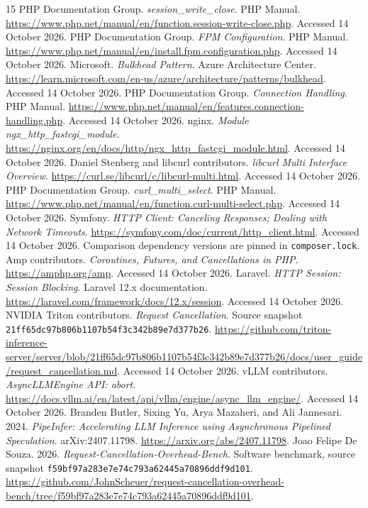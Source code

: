 \documentclass[11pt,a4paper]{article}
\begin{document}
\begin{thebibliography}{15}
 PHP Documentation Group. \emph{session\_write\_close}. PHP Manual. \url{https://www.php.net/manual/en/function.session-write-close.php}. Accessed 14 October 2026.
 PHP Documentation Group. \emph{FPM Configuration}. PHP Manual. \url{https://www.php.net/manual/en/install.fpm.configuration.php}. Accessed 14 October 2026.
 Microsoft. \emph{Bulkhead Pattern}. Azure Architecture Center. \url{https://learn.microsoft.com/en-us/azure/architecture/patterns/bulkhead}. Accessed 14 October 2026.
 PHP Documentation Group. \emph{Connection Handling}. PHP Manual. \url{https://www.php.net/manual/en/features.connection-handling.php}. Accessed 14 October 2026.
 nginx. \emph{Module ngx\_http\_fastcgi\_module}. \url{https://nginx.org/en/docs/http/ngx_http_fastcgi_module.html}. Accessed 14 October 2026.
 Daniel Stenberg and libcurl contributors. \emph{libcurl Multi Interface Overview}. \url{https://curl.se/libcurl/c/libcurl-multi.html}. Accessed 14 October 2026.
 PHP Documentation Group. \emph{curl\_multi\_select}. PHP Manual. \url{https://www.php.net/manual/en/function.curl-multi-select.php}. Accessed 14 October 2026.
 Symfony. \emph{HTTP Client: Canceling Responses; Dealing with Network Timeouts}. \url{https://symfony.com/doc/current/http_client.html}. Accessed 14 October 2026. Comparison dependency versions are pinned in \texttt{composer.lock}.
 Amp contributors. \emph{Coroutines, Futures, and Cancellations in PHP}. \url{https://amphp.org/amp}. Accessed 14 October 2026.
 Laravel. \emph{HTTP Session: Session Blocking}. Laravel 12.x documentation. \url{https://laravel.com/framework/docs/12.x/session}. Accessed 14 October 2026.
 NVIDIA Triton contributors. \emph{Request Cancellation}. Source snapshot \texttt{21ff65dc97b806b1107b54f3c342b89e7d377b26}. \url{https://github.com/triton-inference-server/server/blob/21ff65dc97b806b1107b54f3c342b89e7d377b26/docs/user_guide/request_cancellation.md}. Accessed 14 October 2026.
 vLLM contributors. \emph{AsyncLLMEngine API: abort}. \url{https://docs.vllm.ai/en/latest/api/vllm/engine/async_llm_engine/}. Accessed 14 October 2026.
 Branden Butler, Sixing Yu, Arya Mazaheri, and Ali Jannesari. 2024. \emph{PipeInfer: Accelerating LLM Inference using Asynchronous Pipelined Speculation}. arXiv:2407.11798. \url{https://arxiv.org/abs/2407.11798}.
 Joao Felipe De Souza. 2026. \emph{Request-Cancellation-Overhead-Bench}. Software benchmark, source snapshot \texttt{f59bf97a283e7e74c793a62445a70896ddf9d101}. \url{https://github.com/JohnScheuer/request-cancellation-overhead-bench/tree/f59bf97a283e7e74c793a62445a70896ddf9d101}.
\end{thebibliography}
\end{document}
